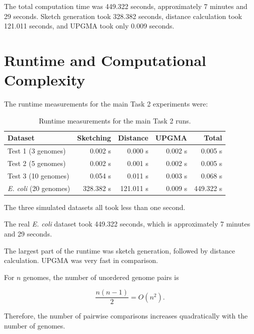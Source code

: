 \documentclass[11pt,a4paper]{article}
\begin{document}
The total computation time was 449.322 seconds, approximately
7 minutes and 29 seconds. Sketch generation took 328.382 seconds,
distance calculation took 121.011 seconds, and UPGMA took only
0.009 seconds.


\section{Runtime and Computational Complexity}

The runtime measurements for the main Task 2 experiments were:

\begin{table}[H]
\centering
\small
\caption{Runtime measurements for the main Task 2 runs.}
\begin{tabular}{lrrrr}
\toprule
Dataset & Sketching & Distance & UPGMA & Total\\
\midrule
Test 1 (3 genomes)
& 0.002 s & 0.000 s & 0.002 s & 0.005 s\\

Test 2 (5 genomes)
& 0.002 s & 0.001 s & 0.002 s & 0.005 s\\

Test 3 (10 genomes)
& 0.054 s & 0.011 s & 0.003 s & 0.068 s\\

\textit{E. coli} (20 genomes)
& 328.382 s & 121.011 s & 0.009 s & 449.322 s\\

\bottomrule
\end{tabular}
\end{table}

The three simulated datasets all took less than one second.

The real \textit{E. coli} dataset took 449.322 seconds, which is approximately
7 minutes and 29 seconds.

The largest part of the runtime was sketch generation, followed by distance
calculation. UPGMA was very fast in comparison.

For $n$ genomes, the number of unordered genome pairs is

\begin{equation}
\frac{n(n-1)}{2}=O(n^2).
\end{equation}

Therefore, the number of pairwise comparisons increases quadratically with
the number of genomes.
\end{document}
